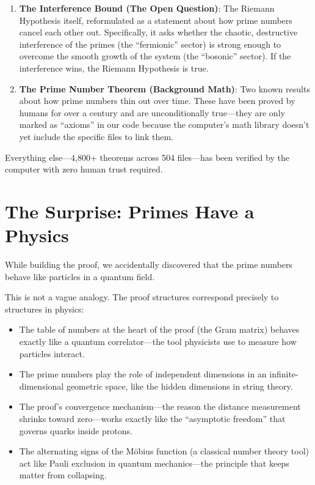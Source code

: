 \documentclass[11pt,a4paper]{article}
\begin{document}
\begin{enumerate}
  \item \textbf{The Interference Bound (The Open Question)}: The
    Riemann Hypothesis itself, reformulated as a statement about how
    prime numbers cancel each other out. Specifically, it asks whether
    the chaotic, destructive interference of the primes (the
    ``fermionic'' sector) is strong enough to overcome the smooth
    growth of the system (the ``bosonic'' sector). If the interference
    wins, the Riemann Hypothesis is true.
  \item \textbf{The Prime Number Theorem (Background Math)}: Two
    known results about how prime numbers thin out over time. These
    have been proved by humans for over a century and are
    unconditionally true---they are only marked as ``axioms'' in our
    code because the computer's math library doesn't yet include the
    specific files to link them.
\end{enumerate}

Everything else---4{,}800+ theorems across 504 files---has been
verified by the computer with zero human trust required.

\section{The Surprise: Primes Have a Physics}

While building the proof, we accidentally discovered that the
prime numbers behave like particles in a quantum field.

This is not a vague analogy. The proof structures correspond
precisely to structures in physics:

\begin{itemize}
  \item The table of numbers at the heart of the proof (the Gram
    matrix) behaves exactly like a quantum correlator---the tool
    physicists use to measure how particles interact.
  \item The prime numbers play the role of independent dimensions
    in an infinite-dimensional geometric space, like the hidden
    dimensions in string theory.
  \item The proof's convergence mechanism---the reason the distance
    measurement shrinks toward zero---works exactly like the
    ``asymptotic freedom'' that governs quarks inside protons.
  \item The alternating signs of the M\"obius function (a classical
    number theory tool) act like Pauli exclusion in quantum
    mechanics---the principle that keeps matter from collapsing.
\end{itemize}
\end{document}
